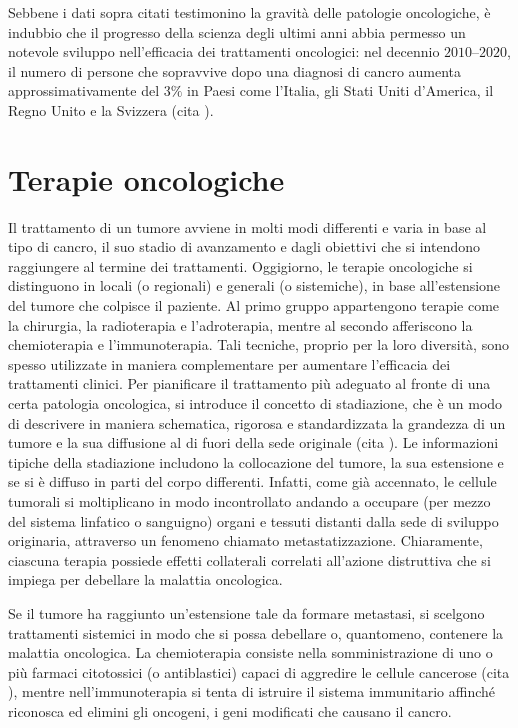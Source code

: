 \documentclass[12pt,a4paper,twoside]{report}
\begin{document}
	Sebbene i dati sopra citati testimonino la gravità delle patologie oncologiche, è indubbio che il progresso della scienza degli ultimi anni abbia permesso un notevole sviluppo nell'efficacia dei trattamenti oncologici: nel decennio $2010$--$2020$, il numero di persone che sopravvive dopo una diagnosi di cancro aumenta approssimativamente del $3\%$ in Paesi come l'Italia, gli Stati Uniti d'America, il Regno Unito e la Svizzera (cita
	).
	
	\section{Terapie oncologiche}
	Il trattamento di un tumore avviene in molti modi differenti e varia in base al tipo di cancro, il suo stadio di avanzamento e dagli obiettivi che si intendono raggiungere al termine dei trattamenti. Oggigiorno, le terapie oncologiche si distinguono in locali (o regionali) e generali (o sistemiche), in base all'estensione del tumore che colpisce il paziente. Al primo gruppo appartengono terapie come la chirurgia, la radioterapia e l'adroterapia, mentre al secondo afferiscono la chemioterapia e l'immunoterapia. Tali tecniche, proprio per la loro diversità, sono spesso utilizzate in maniera complementare per aumentare l'efficacia dei trattamenti clinici. Per pianificare il trattamento più adeguato al fronte di una certa patologia oncologica, si introduce il concetto di stadiazione, che è un modo di descrivere in maniera schematica, rigorosa e standardizzata la grandezza di un tumore e la sua diffusione al di fuori della sede originale (cita
	). Le informazioni tipiche della stadiazione includono la collocazione del tumore, la sua estensione e se si è diffuso in parti del corpo differenti. Infatti, come già accennato, le cellule tumorali si moltiplicano in modo incontrollato andando a occupare (per mezzo del sistema linfatico o sanguigno) organi e tessuti distanti dalla sede di sviluppo originaria, attraverso un fenomeno chiamato metastatizzazione. Chiaramente, ciascuna terapia possiede effetti collaterali correlati all'azione distruttiva che si impiega per debellare la malattia oncologica.
	
	Se il tumore ha raggiunto un'estensione tale da formare metastasi, si scelgono trattamenti sistemici in modo che si possa debellare o, quantomeno, contenere la malattia oncologica. La chemioterapia consiste nella somministrazione di uno o più farmaci citotossici (o antiblastici) capaci di aggredire le cellule cancerose (cita
	), mentre nell'immunoterapia si tenta di istruire il sistema immunitario affinché riconosca ed elimini gli oncogeni, i geni modificati che causano il cancro.
	
\end{document}
